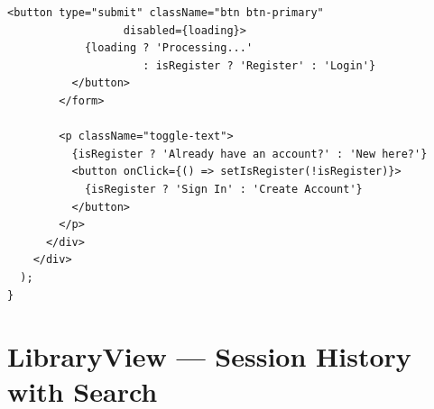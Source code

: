 \documentclass[11pt,a4paper,twoside]{report}
\begin{document}
\begin{lstlisting}[style=jsstyle,caption={AuthModal.jsx --- Dual-Mode Authentication}]
          <button type="submit" className="btn btn-primary"
                  disabled={loading}>
            {loading ? 'Processing...'
                     : isRegister ? 'Register' : 'Login'}
          </button>
        </form>

        <p className="toggle-text">
          {isRegister ? 'Already have an account?' : 'New here?'}
          <button onClick={() => setIsRegister(!isRegister)}>
            {isRegister ? 'Sign In' : 'Create Account'}
          </button>
        </p>
      </div>
    </div>
  );
}
\end{lstlisting}

\section{LibraryView --- Session History with Search}
\end{document}
